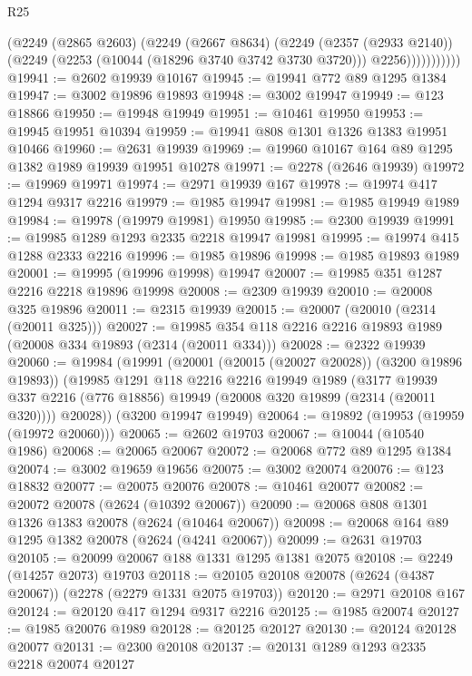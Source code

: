 \begin{lexlean}{R25}
\begin{coremodule}
                  (@2249
                    (@2865 @2603)
                    (@2249
                      (@2667 @8634)
                      (@2249
                        (@2357 (@2933 @2140))
                        (@2249 (@2253 (@10044 (@18296 @3740 @3742 @3730 @3720))) @2256)))))))))))
@19941 := @2602 @19939 @10167
@19945 := @19941 @772 @89 @1295 @1384
@19947 := @3002 @19896 @19893
@19948 := @3002 @19947
@19949 := @123 @18866
@19950 := @19948 @19949
@19951 := @10461 @19950
@19953 := @19945 @19951 @10394
@19959 := @19941 @808 @1301 @1326 @1383 @19951 @10466
@19960 := @2631 @19939
@19969 := @19960 @10167 @164 @89 @1295 @1382 @1989 @19939 @19951 @10278
@19971 := @2278 (@2646 @19939)
@19972 := @19969 @19971
@19974 := @2971 @19939 @167
@19978 := @19974 @417 @1294 @9317 @2216
@19979 := @1985 @19947
@19981 := @1985 @19949 @1989
@19984 := @19978 (@19979 @19981) @19950
@19985 := @2300 @19939
@19991 := @19985 @1289 @1293 @2335 @2218 @19947 @19981
@19995 := @19974 @415 @1288 @2333 @2216
@19996 := @1985 @19896
@19998 := @1985 @19893 @1989
@20001 := @19995 (@19996 @19998) @19947
@20007 := @19985 @351 @1287 @2216 @2218 @19896 @19998
@20008 := @2309 @19939
@20010 := @20008 @325 @19896
@20011 := @2315 @19939
@20015 := @20007 (@20010 (@2314 (@20011 @325)))
@20027 := @19985 @354 @118 @2216 @2216 @19893 @1989 (@20008 @334 @19893 (@2314 (@20011 @334)))
@20028 := @2322 @19939
@20060 := @19984
    (@19991
      (@20001 (@20015 (@20027 @20028)) (@3200 @19896 @19893))
      (@19985
        @1291
        @118
        @2216
        @2216
        @19949
        @1989
        (@3177 @19939 @337 @2216 (@776 @18856) @19949 (@20008 @320 @19899 (@2314 (@20011 @320))))
        @20028))
    (@3200 @19947 @19949)
@20064 := @19892 (@19953 (@19959 (@19972 @20060)))
@20065 := @2602 @19703
@20067 := @10044 (@10540 @1986)
@20068 := @20065 @20067
@20072 := @20068 @772 @89 @1295 @1384
@20074 := @3002 @19659 @19656
@20075 := @3002 @20074
@20076 := @123 @18832
@20077 := @20075 @20076
@20078 := @10461 @20077
@20082 := @20072 @20078 (@2624 (@10392 @20067))
@20090 := @20068 @808 @1301 @1326 @1383 @20078 (@2624 (@10464 @20067))
@20098 := @20068 @164 @89 @1295 @1382 @20078 (@2624 (@4241 @20067))
@20099 := @2631 @19703
@20105 := @20099 @20067 @188 @1331 @1295 @1381 @2075
@20108 := @2249 (@14257 @2073) @19703
@20118 := @20105 @20108 @20078 (@2624 (@4387 @20067)) (@2278 (@2279 @1331 @2075 @19703))
@20120 := @2971 @20108 @167
@20124 := @20120 @417 @1294 @9317 @2216
@20125 := @1985 @20074
@20127 := @1985 @20076 @1989
@20128 := @20125 @20127
@20130 := @20124 @20128 @20077
@20131 := @2300 @20108
@20137 := @20131 @1289 @1293 @2335 @2218 @20074 @20127

\end{coremodule}
\end{lexlean}
